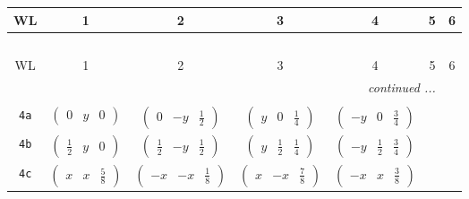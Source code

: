 \documentclass[fleqn,9pt,landscape]{jsarticle}
\begin{document}
\begin{center}
\renewcommand{\arraystretch}{1.2}
\begin{longtable}{ccccccc}
 \hline \hline
WL & 1 & 2 & 3 & 4 & 5 & 6 \\ \hline \endfirsthead

\multicolumn{6}{l}{\tablename\ \thetable{}} \\
 \hline \hline
WL & 1 & 2 & 3 & 4 & 5 & 6 \\ \hline \endhead

 \hline \hline
\multicolumn{6}{r}{\footnotesize\it continued ...} \\ \endfoot

 \hline \hline
\multicolumn{6}{r}{} \\ \endlastfoot

{\tt 4a} & $ \begin{pmatrix} 0 & y & 0 \end{pmatrix} $ & $ \begin{pmatrix} 0 & - y & \frac{1}{2} \end{pmatrix} $ & $ \begin{pmatrix} y & 0 & \frac{1}{4} \end{pmatrix} $ & $ \begin{pmatrix} - y & 0 & \frac{3}{4} \end{pmatrix} $ & $  $ & $  $ \\ \hline
{\tt 4b} & $ \begin{pmatrix} \frac{1}{2} & y & 0 \end{pmatrix} $ & $ \begin{pmatrix} \frac{1}{2} & - y & \frac{1}{2} \end{pmatrix} $ & $ \begin{pmatrix} y & \frac{1}{2} & \frac{1}{4} \end{pmatrix} $ & $ \begin{pmatrix} - y & \frac{1}{2} & \frac{3}{4} \end{pmatrix} $ & $  $ & $  $ \\ \hline
{\tt 4c} & $ \begin{pmatrix} x & x & \frac{5}{8} \end{pmatrix} $ & $ \begin{pmatrix} - x & - x & \frac{1}{8} \end{pmatrix} $ & $ \begin{pmatrix} x & - x & \frac{7}{8} \end{pmatrix} $ & $ \begin{pmatrix} - x & x & \frac{3}{8} \end{pmatrix} $ & $  $ & $  $ \\ \hline

\end{longtable}
\end{center}
\end{document}
